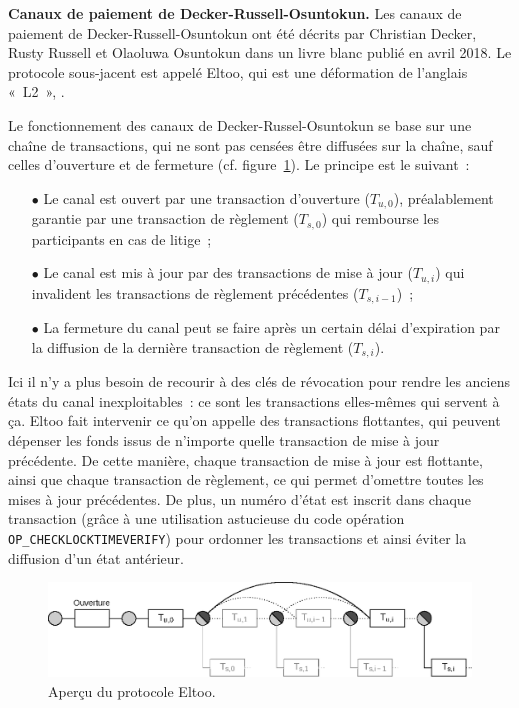 \textbf{Canaux de paiement de Decker-Russell-Osuntokun.} Les canaux de paiement de Decker-Russell-Osuntokun ont été décrits par Christian Decker, Rusty Russell et Olaoluwa Osuntokun dans un livre blanc publié en avril 2018. Le protocole sous-jacent est appelé Eltoo, qui est une déformation de l'anglais «~L2~», .

Le fonctionnement des canaux de Decker-Russel-Osuntokun se base sur une chaîne de transactions, qui ne sont pas censées être diffusées sur la chaîne, sauf celles d'ouverture et de fermeture (cf. figure~\ref{fig:eltoo}). Le principe est le suivant~:

\begin{itemize}
\item[$\bullet$] Le canal est ouvert par une transaction d'ouverture ($T_{u,0}$), préalablement garantie par une transaction de règlement ($T_{s,0}$) qui rembourse les participants en cas de litige~;
\item[$\bullet$] Le canal est mis à jour par des transactions de mise à jour ($T_{u,i}$) qui invalident les transactions de règlement précédentes ($T_{s,i-1}$)~;
\item[$\bullet$] La fermeture du canal peut se faire après un certain délai d'expiration par la diffusion de la dernière transaction de règlement ($T_{s,i}$).
\end{itemize}

Ici il n'y a plus besoin de recourir à des clés de révocation pour rendre les anciens états du canal inexploitables~: ce sont les transactions elles-mêmes qui servent à ça. Eltoo fait intervenir ce qu'on appelle des transactions flottantes, qui peuvent dépenser les fonds issus de n'importe quelle transaction de mise à jour précédente. De cette manière, chaque transaction de mise à jour est flottante, ainsi que chaque transaction de règlement, ce qui permet d'omettre toutes les mises à jour précédentes. De plus, un numéro d'état est inscrit dans chaque transaction (grâce à une utilisation astucieuse du code opération \texttt{OP\_CHECKLOCKTIMEVERIFY}) pour ordonner les transactions et ainsi éviter la diffusion d'un état antérieur.

\begin{figure}[h]
  \centering
  \includegraphics[scale=0.7]{img/eltoo-offchain-protocol.eps}
  \caption{Aperçu du protocole Eltoo.}
  \label{fig:eltoo}
\end{figure}

